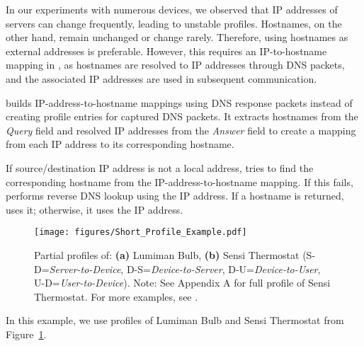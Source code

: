 In our experiments with numerous devices, we observed that IP addresses of servers can change frequently, leading to unstable profiles. Hostnames, on the other hand, remain unchanged or change rarely. Therefore, using hostnames as external addresses is preferable. However, this requires an IP-to-hostname mapping in \system{}, as hostnames are resolved to IP addresses through DNS packets,
and the associated IP addresses are used in subsequent communication.

\system{} builds IP-address-to-hostname mappings using DNS response packets instead of creating profile entries for captured DNS packets. It extracts hostnames from the \textit{Query} field and resolved IP addresses from the \textit{Answer} field to create a mapping from each IP address to its corresponding hostname.

%
If source/destination IP address is not a local address, \system{} tries to find the corresponding hostname from the IP-address-to-hostname mapping. If this fails, \system{} performs reverse DNS lookup using the IP address. If a hostname is returned, \system{} uses it; otherwise, it uses the IP address. 

\begin{figure}[t]
    \centering
    \texttt{[image: figures/Short\_Profile\_Example.pdf]}
    \caption{Partial profiles of: \textbf{(a)} Lumiman Bulb, \textbf{(b)} Sensi Thermostat (S-D=\textit{Server-to-Device}, D-S=\textit{Device-to-Server}, D-U=\textit{Device-to-User}, U-D=\textit{User-to-Device}). 
    Note: See Appendix A for full profile of Sensi Thermostat. 
    For more examples, see \cite{MADEA_dataset}.} 
    \label{fig: profile example}
\end{figure}

In this example, we use profiles of Lumiman Bulb and Sensi Thermostat from Figure~\ref{fig: profile example}.

